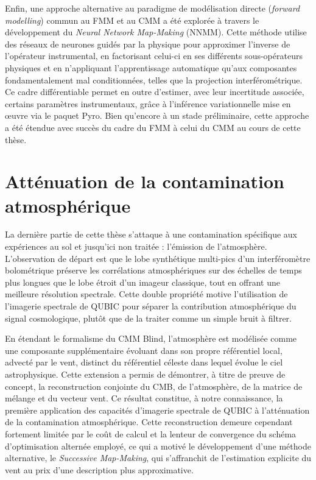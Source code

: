Enfin, une approche alternative au paradigme de modélisation directe (\emph{forward modelling}) commun au FMM et au CMM a été explorée à travers le développement du \emph{Neural Network Map-Making} (NNMM). Cette méthode utilise des réseaux de neurones guidés par la physique pour approximer l'inverse de l'opérateur instrumental, en factorisant celui-ci en ses différents sous-opérateurs physiques et en n'appliquant l'apprentissage automatique qu'aux composantes fondamentalement mal conditionnées, telles que la projection interférométrique. Ce cadre différentiable permet en outre d'estimer, avec leur incertitude associée, certains paramètres instrumentaux, grâce à l'inférence variationnelle mise en œuvre via le paquet Pyro. Bien qu'encore à un stade préliminaire, cette approche a été étendue avec succès du cadre du FMM à celui du CMM au cours de cette thèse.

\section*{Atténuation de la contamination atmosphérique}

La dernière partie de cette thèse s'attaque à une contamination spécifique aux expériences au sol et jusqu'ici non traitée : l'émission de l'atmosphère. L'observation de départ est que le lobe synthétique multi-pics d'un interféromètre bolométrique préserve les corrélations atmosphériques sur des échelles de temps plus longues que le lobe étroit d'un imageur classique, tout en offrant une meilleure résolution spectrale. Cette double propriété motive l'utilisation de l'imagerie spectrale de QUBIC pour séparer la contribution atmosphérique du signal cosmologique, plutôt que de la traiter comme un simple bruit à filtrer.

En étendant le formalisme du CMM Blind, l'atmosphère est modélisée comme une composante supplémentaire évoluant dans son propre référentiel local, advecté par le vent, distinct du référentiel céleste dans lequel évolue le ciel astrophysique. Cette extension a permis de démontrer, à titre de preuve de concept, la reconstruction conjointe du CMB, de l'atmosphère, de la matrice de mélange et du vecteur vent. Ce résultat constitue, à notre connaissance, la première application des capacités d'imagerie spectrale de QUBIC à l'atténuation de la contamination atmosphérique. Cette reconstruction demeure cependant fortement limitée par le coût de calcul et la lenteur de convergence du schéma d'optimisation alternée employé, ce qui a motivé le développement d'une méthode alternative, le \emph{Successive Map-Making}, qui s'affranchit de l'estimation explicite du vent au prix d'une description plus approximative.

